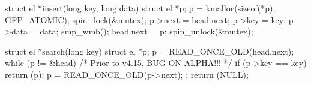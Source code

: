 \begin{listing}[tbp]
\begin{fcvlabel}
\begin{VerbatimL}[commandchars=\\\[\]]
struct el *insert(long key, long data)
{
	struct el *p;
	p = kmalloc(sizeof(*p), GFP_ATOMIC);
	spin_lock(&mutex);
	p->next = head.next;		\lnlbl[init:b]
	p->key = key;
	p->data = data;			\lnlbl[init:e]
	smp_wmb();			\lnlbl[wmb]
	head.next = p;			\lnlbl[add]
	spin_unlock(&mutex);
}

struct el *search(long key)
{
	struct el *p;
	p = READ_ONCE_OLD(head.next);	\lnlbl[h:next]
	while (p != &head) {
		/* Prior to v4.15, BUG ON ALPHA!!! */ \lnlbl[BUG]
		if (p->key == key) {	\lnlbl[key]
			return (p);
		}
		p = READ_ONCE_OLD(p->next);	\lnlbl[next]
	};
	return (NULL);
}
\end{VerbatimL}
\end{fcvlabel}
\caption{Insert and Lock-Free Search (No Ordering)}
\label{lst:memorder:Insert and Lock-Free Search (No Ordering)}
\end{listing}

